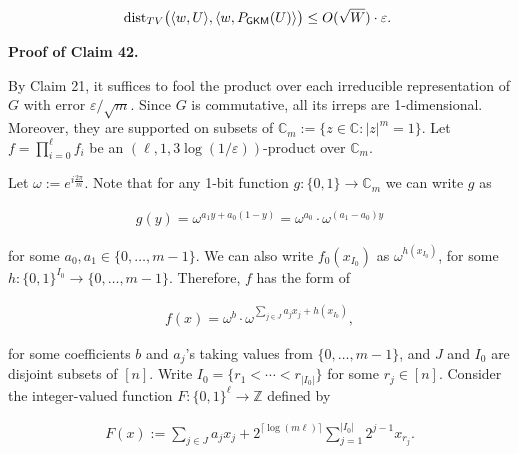 \documentclass[10pt,a4paper]{article}
\begin{document}
\[\begin{gathered}
\textnormal{dist}_{TV}\bigl{(}\langle w,U\rangle,\langle w,P_{\mathsf{GKM}}(U)\rangle\bigr{)}\leq O(\sqrt{W})\cdot\varepsilon.\
\end{gathered}\]






\par\medskip\noindent\textbf{Proof of Claim 42.}\par




By Claim 21, it suffices to fool the product over each irreducible representation of $G$ with error $\varepsilon/\sqrt{m}$.
Since $G$ is commutative, all its irreps are 1-dimensional.
Moreover, they are supported on subsets of $\mathbb{C}_{m}:=\{z\in\mathbb{C}:\lvert z\rvert^{m}=1\}$.
Let $f=\prod_{i=0}^{\ell}f_{i}$ be an $(\ell,1,3\log(1/\varepsilon))$-product over $\mathbb{C}_{m}$.\par




Let $\omega:=e^{i\frac{2\pi}{m}}$.
Note that for any 1-bit function $g\colon\{0,1\}\to\mathbb{C}_{m}$ we can write $g$ as\par


\[\begin{gathered}
g(y)=\omega^{a_{1}y+a_{0}(1-y)}=\omega^{a_{0}}\cdot\omega^{(a_{1}-a_{0})y}
\end{gathered}\]


for some $a_{0},a_{1}\in\{0,\ldots,m-1\}$.
We can also write $f_{0}(x_{I_{0}})$ as $\omega^{h(x_{I_{0}})}$, for some $h\colon\{0,1\}^{I_{0}}\to\{0,\ldots,m-1\}$.
Therefore, $f$ has the form of\par


\[\begin{gathered}
f(x)=\omega^{b}\cdot\omega^{\sum_{j\in J}a_{j}x_{j}+h(x_{I_{0}})},
\end{gathered}\]


for some coefficients $b$ and $a_{j}$’s taking values from $\{0,\ldots,m-1\}$, and $J$ and $I_{0}$ are disjoint subsets of $[n]$.
Write $I_{0}=\{r_{1}<\cdots<r_{\lvert I_{0}\rvert}\}$ for some $r_{j}\in[n]$.
Consider the integer-valued function $F\colon\{0,1\}^{\ell}\to\mathbb{Z}$ defined by\par


\[\begin{gathered}
F(x):=\sum_{j\in J}a_{j}x_{j}+2^{\lceil\log(m\ell)\rceil}\sum_{j=1}^{\lvert I_{0}\rvert}2^{j-1}x_{r_{j}}.
\end{gathered}\]
\end{document}
